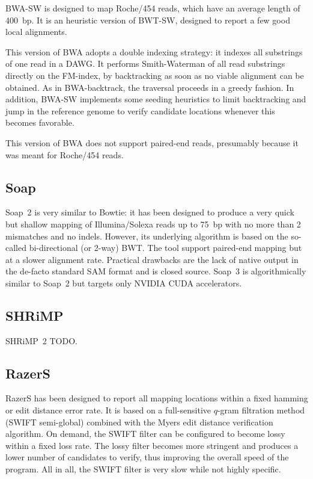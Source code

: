 BWA-SW \citep{Li2010a} is designed to map Roche/454 reads, which have an average length of 400~bp.
It is an heuristic version of BWT-SW, designed to report a few good local alignments.

This version of BWA adopts a double indexing strategy: it indexes all substrings of one read in a DAWG.
It performs Smith-Waterman of all read substrings directly on the FM-index, by backtracking as soon as no viable alignment can be obtained.
As in BWA-backtrack, the traversal proceeds in a greedy fashion.
In addition, BWA-SW implements some seeding heuristics to limit backtracking and jump in the reference genome to verify candidate locations whenever this becomes favorable.

This version of BWA does not support paired-end reads, presumably because it was meant for Roche/454 reads.


\subsection{Soap}

Soap~2 \citep{Li2009b} is very similar to Bowtie: it has been designed to produce a very quick but shallow mapping of Illumina/Solexa reads up to 75~bp with no more than 2 mismatches and no indels.
However, its underlying algorithm is based on the so-called bi-directional (or 2-way) BWT.
The tool support paired-end mapping but at a slower alignment rate.
Practical drawbacks are the lack of native output in the de-facto standard SAM format and is closed source.
Soap~3 \citep{Liu2012} is algorithmically similar to Soap~2 but targets only NVIDIA CUDA accelerators.


\subsection{SHRiMP}

SHRiMP~2 TODO.


\subsection{RazerS}

RazerS \citep{Weese2009} has been designed to report all mapping locations within a fixed hamming or edit distance error rate.
It is based on a full-sensitive $q$-gram filtration method (SWIFT semi-global) combined with the Myers edit distance verification algorithm.
On demand, the SWIFT filter can be configured to become lossy within a fixed loss rate.
The lossy filter becomes more stringent and produces a lower number of candidates to verify, thus improving the overall speed of the program.
All in all, the SWIFT filter is very slow while not highly specific.


